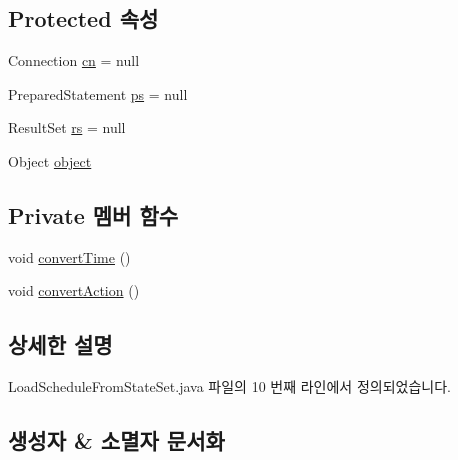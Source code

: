 \subsection*{Protected 속성}
\begin{DoxyCompactItemize}
\item 
Connection \mbox{\hyperlink{classcom_1_1github_1_1aites_1_1framework_1_1globalknowledge_1_1_d_b_connector_af00c95ca08c2b39cb47ee4286e9f2469}{cn}} = null
\item 
Prepared\+Statement \mbox{\hyperlink{classcom_1_1github_1_1aites_1_1framework_1_1globalknowledge_1_1_d_b_connector_a2a6dbc151015e5fe147a4d155ae7a145}{ps}} = null
\item 
Result\+Set \mbox{\hyperlink{classcom_1_1github_1_1aites_1_1framework_1_1globalknowledge_1_1_d_b_connector_a36c87b41d86e8382bea688b2ca209764}{rs}} = null
\item 
Object \mbox{\hyperlink{classcom_1_1github_1_1aites_1_1framework_1_1globalknowledge_1_1_d_b_connector_ab6f6f9f00c22d311dca48a3a424fd6a3}{object}}
\end{DoxyCompactItemize}
\subsection*{Private 멤버 함수}
\begin{DoxyCompactItemize}
\item 
void \mbox{\hyperlink{classcom_1_1github_1_1aites_1_1framework_1_1globalknowledge_1_1_load_schedule_from_state_set_a1894854faffd845ebc86877bd299dd51}{convert\+Time}} ()
\item 
void \mbox{\hyperlink{classcom_1_1github_1_1aites_1_1framework_1_1globalknowledge_1_1_load_schedule_from_state_set_ad91903aa1620cad091ef94cdb1c05ae3}{convert\+Action}} ()
\end{DoxyCompactItemize}


\subsection{상세한 설명}


Load\+Schedule\+From\+State\+Set.\+java 파일의 10 번째 라인에서 정의되었습니다.



\subsection{생성자 \& 소멸자 문서화}
\mbox{\label{classcom_1_1github_1_1aites_1_1framework_1_1globalknowledge_1_1_load_schedule_from_state_set_a7eae5d4171d4270ad2d1398291b2312f}} 
